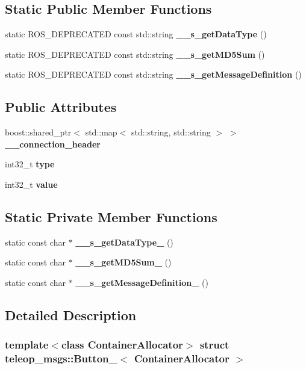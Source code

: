 \subsection*{Static Public Member Functions}
\begin{DoxyCompactItemize}
\item 
static ROS\_\-DEPRECATED const std::string {\bf \_\-\_\-s\_\-getDataType} ()
\item 
static ROS\_\-DEPRECATED const std::string {\bf \_\-\_\-s\_\-getMD5Sum} ()
\item 
static ROS\_\-DEPRECATED const std::string {\bf \_\-\_\-s\_\-getMessageDefinition} ()
\end{DoxyCompactItemize}
\subsection*{Public Attributes}
\begin{DoxyCompactItemize}
\item 
boost::shared\_\-ptr$<$ std::map$<$ std::string, std::string $>$ $>$ {\bf \_\-\_\-connection\_\-header}
\item 
int32\_\-t {\bf type}
\item 
int32\_\-t {\bf value}
\end{DoxyCompactItemize}
\subsection*{Static Private Member Functions}
\begin{DoxyCompactItemize}
\item 
static const char $\ast$ {\bf \_\-\_\-s\_\-getDataType\_\-} ()
\item 
static const char $\ast$ {\bf \_\-\_\-s\_\-getMD5Sum\_\-} ()
\item 
static const char $\ast$ {\bf \_\-\_\-s\_\-getMessageDefinition\_\-} ()
\end{DoxyCompactItemize}


\subsection{Detailed Description}
\subsubsection*{template$<$class ContainerAllocator$>$ struct teleop\_\-msgs::Button\_\-$<$ ContainerAllocator $>$}




